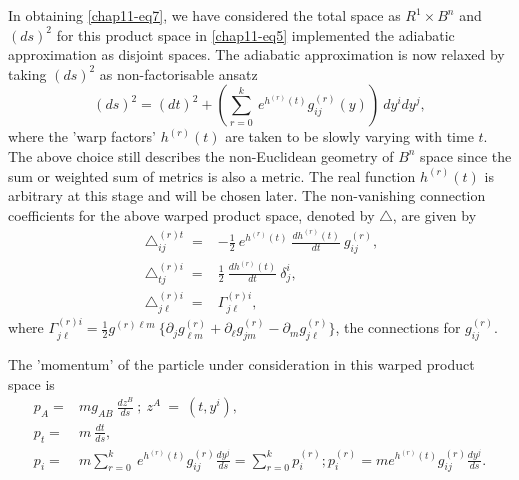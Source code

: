 In obtaining \eqref{chap11-eq7}, we have considered the total space as $R^1\times B^n$ and $(ds)^2$ for this product space in \eqref{chap11-eq5} implemented the adiabatic approximation as disjoint spaces. The adiabatic approximation is now relaxed by taking  $(ds)^2$ as non-factorisable ansatz 
\setcounter{equation}{8}
\begin{equation}
(ds)^2= (dt)^2+\left(\sum_{r=0}^k\ e^{h^{(r)}(t)}g_{ij}^{(r)}(y)\right)\ dy^idy^j,\label{chap11-eq9}
\end{equation}
where the 'warp factors' $h^{(r)}(t)$ are taken to be slowly varying with time $t$. The above choice still describes the  non-Euclidean geometry of $B^n$ space since the sum or weighted sum of metrics is also a metric. The real function $h^{(r)}(t)$  is arbitrary at this stage and will be chosen later. The non-vanishing connection coefficients for the above warped product  space, denoted by $\bigtriangleup$, are given by 
\begin{align}
{\bigtriangleup}^{(r) t}_{ij}= &-\frac{1}{2}\ e^{h^{(r)}(t)}\ \frac{dh^{(r)}(t)}{dt}\ g_{ij}^{(r)}, \nonumber \\
{\bigtriangleup}^{(r) i}_{tj}= &\frac{1}{2}\ \frac{dh^{(r)}(t)}{dt}\ {\delta}^i_j, \nonumber \\
{\bigtriangleup}^{(r) i}_{j\ell}= &{\Gamma}^{(r) i}_{j\ell},\label{chap11-eq10}
\end{align}
where ${\Gamma}^{(r) i}_{j\ell}=\frac{1}{2}g^{(r)\ell m}\ \{{\partial}_jg^{(r)}_{\ell m}+{\partial}_{\ell}g^{(r)}_{jm} 
-{\partial}_mg^{(r)}_{j\ell}\}$, the connections for $g_{ij}^{(r)}$. 

The 'momentum' of the particle under consideration in this warped product space is 
\begin{align}
p_A= &mg_{AB}\ \frac{dz^B}{ds}\ ;\ z^A\ =\ (t,y^i), \nonumber \\
p_t= &m\ \frac{dt}{ds}, \nonumber \\
p_i= &m\sum_{r=0}^k\ e^{h^{(r)}(t)}g_{ij}^{(r)}\frac{dy^j}{ds}=\sum_{r=0}^k p_i^{(r)}; p_i^{(r)}=me^{h^{(r)}(t)}
g_{ij}^{(r)}\frac{dy^j}{ds}.\label{chap11-eq11}
\end{align}

